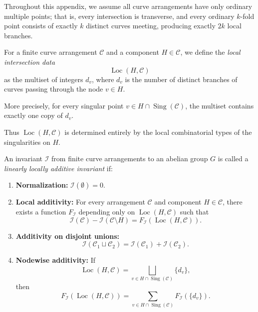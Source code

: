 \documentclass[article,11pt]{amsart} \numberwithin{equation}{section}
\numberwithin{equation}{section}
\begin{document}
{Throughout this appendix, we assume all curve arrangements have only ordinary multiple points; that is, every intersection is transverse, and every ordinary \(k\)-fold point consists of exactly \(k\) distinct curves meeting, producing exactly \(2k\) local branches.

\begin{df}
	\label{def:local_data_app}
	For a finite curve arrangement \(\mathcal C\) and a component \(H \in \mathcal C\), we define the \emph{local intersection data}
	\[
	\operatorname{Loc}(H,\mathcal C)
	\]
	as the multiset of integers \(d_v\), where \(d_v\) is the number of distinct branches of curves passing through the node \(v \in H\).
	
	More precisely, for every singular point \(v \in H \cap \operatorname{Sing}(\mathcal C)\), the multiset contains exactly one copy of \(d_v\).
	
	Thus \(\operatorname{Loc}(H,\mathcal C)\) is determined entirely by the local combinatorial types of the singularities on \(H\).
\end{df}

\begin{df}
	\label{def:linear_locally_additive_app}
	An invariant \(\mathcal I\) from finite curve arrangements to an abelian group \(G\) is called a \emph{linearly locally additive invariant} if:
	
	\begin{enumerate}
		\item \textbf{Normalization:} \(\mathcal I(\emptyset)=0\).
		
		\item \textbf{Local additivity:} For every arrangement \(\mathcal C\) and component \(H \in \mathcal C\), there exists a function \(F_{\mathcal I}\) depending only on \(\operatorname{Loc}(H,\mathcal C)\) such that
		\[
		\mathcal I(\mathcal C)-\mathcal I(\mathcal C\setminus H)=F_{\mathcal I}(\operatorname{Loc}(H,\mathcal C)).
		\]
		
		\item \textbf{Additivity on disjoint unions:}
		\[
		\mathcal I(\mathcal C_1\sqcup \mathcal C_2)=\mathcal I(\mathcal C_1)+\mathcal I(\mathcal C_2).
		\]
		
		\item \textbf{Nodewise additivity:} If
		\[
		\operatorname{Loc}(H,\mathcal C)=\bigsqcup_{v\in H\cap\operatorname{Sing}(\mathcal C)} \{d_v\},
		\]
		then
		\[
		F_{\mathcal I}(\operatorname{Loc}(H,\mathcal C))=\sum_{v\in H\cap\operatorname{Sing}(\mathcal C)} F_{\mathcal I}(\{d_v\}).
		\]
		

\end{enumerate}
\end{df}}
\end{document}
